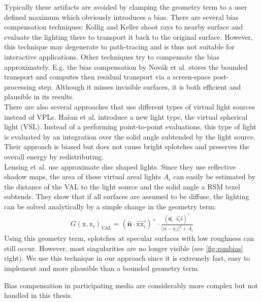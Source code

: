 \documentclass[thesis.tex]{subfiles}
\begin{document}
Typically these artifacts are avoided by clamping the geometry term to a user defined maximum which obviously introduces a bias.
There are several bias compensation techniques:
Kollig and Keller \cite{bib:biascomp:kk04} shoot rays to nearby surface and evaluate the lighting there to transport it back to the original surface.
However, this technique may degenerate to path-tracing and is thus not suitable for interactive applications.
Other techniques try to compensate the bias approximately.
E.g. the bias compensation by Nov\'{a}k et al. \cite{bib:biascomp:novak11} stores the bounded transport and computes then residual transport via a screen-space post-processing step.
Although it misses invisible surfaces, it is both efficient and plausible in its results.
\\
There are also several approaches that use different types of virtual light sources instead of VPLs.
Ha{\v{s}}an et al. \cite{bib:biascomp:vsl} introduce a new light type, the virtual spherical light (VSL).
Instead of a performing point-to-point evaluations, this type of light is evaluated by an integration over the solid angle subtended by the light source.
Their approach is biased but does not cause bright splotches and preserves the overall energy by redistributing.
\\
Lensing et al. \cite{bib:LightskinPaper} use approximate disc shaped lights.
Since they use reflective shadow maps, the area of these virtual areal lights $A_{i}$ can easily be estimated by the distance of the VAL to the light source and the solid angle a RSM texel subtends.
They show that if all surfaces are assumed to be diffuse, the lighting can be solved analytically by a simple change in the geometry term:
\begin{align}
G(\mathrm{x}, \mathrm{x}_i)_{VAL} = (\hat{\mathbf{n}} \cdot \overrightarrow{\mathrm{x}\mathrm{x}_i})^+ \cdot \frac{(\hat{\mathbf{n}_i} \cdot \overrightarrow{\mathrm{x}_i\mathrm{x}} )^+}{||\mathrm{x} - \mathrm{x}_i||^2 + A_{i}}
\end{align}
Using this geometry term, splotches at specular surfaces with low roughness can still occur.
However, most singularities are no longer visible (see \autoref{fig:rsmbias} right).
We use this technique in our approach since it is extremely fast, easy to implement and more plausible than a bounded geometry term.

Bias compensation in participating media are considerably more complex but not handled in this thesis.
\end{document}
